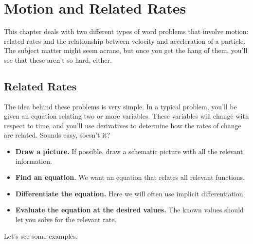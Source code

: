 \chapter{Motion and Related Rates}
This chapter deals with two different types of word problems that involve motion: related rates and the relationship between velocity and acceleration of a particle. The subject matter might seem acrane, but once you get the hang of them, you'll see that these aren't so hard, either.

\section{Related Rates}
The idea behind these problems is very simple. In a typical problem, you'll be given an equation relating two or more variables. These variables will change with respect to time, and you'll use derivatives to determine how the rates of change are related. Sounds easy, soesn't it?\\

\begin{proposition}\hfil
    \begin{itemize}
    \item\textbf{Draw a picture.} If possible, draw a schematic picture with all the relevant information. 
    \item\textbf{Find an equation.} We want an equation that relates all relevant functions. 
    \item\textbf{Differentiate the equation.} Here we will often use
      implicit differentiation.
    \item\textbf{Evaluate the equation at the desired values.}  The known values
      should let you solve for the relevant rate.
    \end{itemize}
    \cite{mooc}
\end{proposition}

Let's see some examples. \cite{mooc} \\

